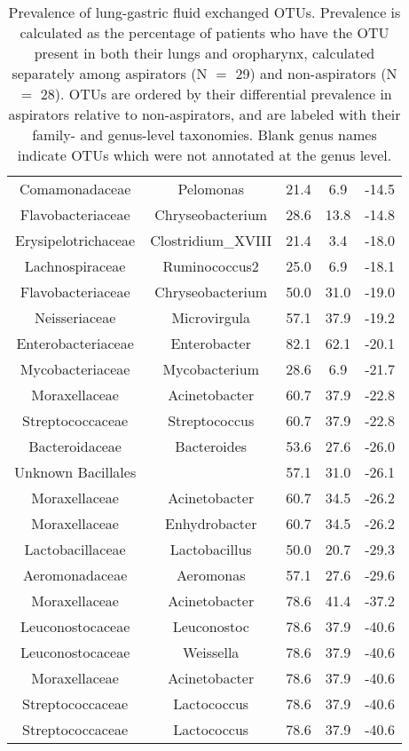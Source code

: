 \documentclass{article}
\begin{document}
\begin{table}
\begin{center}
\begin{tabular}{ccccc}
	Comamonadaceae & Pelomonas & 21.4 & 6.9 & -14.5 \\ 
	Flavobacteriaceae & Chryseobacterium & 28.6 & 13.8 & -14.8 \\ 
	Erysipelotrichaceae & Clostridium\_XVIII & 21.4 & 3.4 & -18.0 \\ 
	Lachnospiraceae & Ruminococcus2 & 25.0 & 6.9 & -18.1 \\ 
	Flavobacteriaceae & Chryseobacterium & 50.0 & 31.0 & -19.0 \\ 
	Neisseriaceae & Microvirgula & 57.1 & 37.9 & -19.2 \\ 
	Enterobacteriaceae & Enterobacter & 82.1 & 62.1 & -20.1 \\ 
	Mycobacteriaceae & Mycobacterium & 28.6 & 6.9 & -21.7 \\ 
	Moraxellaceae & Acinetobacter & 60.7 & 37.9 & -22.8 \\ 
	Streptococcaceae & Streptococcus & 60.7 & 37.9 & -22.8 \\ 
	Bacteroidaceae & Bacteroides & 53.6 & 27.6 & -26.0 \\ 
	Unknown Bacillales &  & 57.1 & 31.0 & -26.1 \\ 
	Moraxellaceae & Acinetobacter & 60.7 & 34.5 & -26.2 \\ 
	Moraxellaceae & Enhydrobacter & 60.7 & 34.5 & -26.2 \\ 
	Lactobacillaceae & Lactobacillus & 50.0 & 20.7 & -29.3 \\ 
	Aeromonadaceae & Aeromonas & 57.1 & 27.6 & -29.6 \\ 
	Moraxellaceae & Acinetobacter & 78.6 & 41.4 & -37.2 \\ 
	Leuconostocaceae & Leuconostoc & 78.6 & 37.9 & -40.6 \\ 
	Leuconostocaceae & Weissella & 78.6 & 37.9 & -40.6 \\ 
	Moraxellaceae & Acinetobacter & 78.6 & 37.9 & -40.6 \\ 
	Streptococcaceae & Lactococcus & 78.6 & 37.9 & -40.6 \\ 
	Streptococcaceae & Lactococcus & 78.6 & 37.9 & -40.6 \\ 
	\bottomrule
\end{tabular}
\caption{Prevalence of lung-gastric fluid exchanged OTUs. Prevalence is calculated as the percentage of patients who have the OTU present in both their lungs and oropharynx, calculated separately among aspirators (N $=$ 29) and non-aspirators (N $=$ 28). OTUs are ordered by their differential prevalence in aspirators relative to non-aspirators, and are labeled with their family- and genus-level taxonomies. Blank genus names indicate OTUs which were not annotated at the genus level.}\label{tab:bal-gastric-exchanged}
\end{center}
\end{table}
\end{document}
